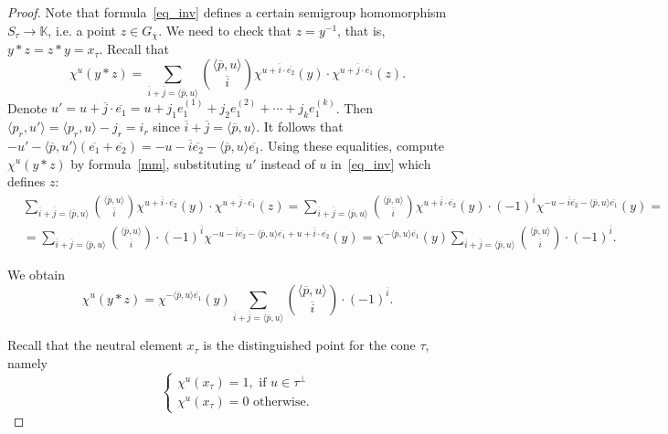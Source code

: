\documentclass[a4paper, 11pt]{amsart}
\theoremstyle{plain}
\theoremstyle{remark}
\theoremstyle{definition}
\newcommand{\KK}{\mathbb{K}}
\newcommand{\GG}{G_{\overline{\chi}}}
\newcommand{\ol}[1]{\overline{#1}}
\begin{document}
\begin{proof}
Note that formula~\eqref{eq_inv} defines a certain semigroup homomorphism $S_\tau \to \KK$, i.e. a point $z \in \GG$. We need to check that $z = y^{-1}$, that is, $y*z = z*y = x_\tau$. Recall that
\begin{equation}\label{mm}
	\chi^u (y * z) = \sum \limits_{\ol{i} + \ol{j} = \langle \ol{p}, u \rangle } { \langle \ol{p}, u \rangle \choose \ol{i} } \chi^{u + \ol{i}\cdot \ol{e_2}}(y) \cdot  \chi^{u + \ol{j}\cdot \ol{e_1}} (z).
\end{equation}
Denote $u' = u + \ol{j}\cdot \ol{e_1} = u + j_1 e_1^{(1)} + j_2 e_1^{(2)} + \cdots + j_k e_1^{(k)}$. Then $\langle p_r, u' \rangle = \langle p_r, u \rangle - j_r = i_r$ since $\ol{i} + \ol{j} = \langle \ol{p}, u \rangle$. It follows that $-u' - \langle \ol{p}, u' \rangle (\ol{e_1} + \ol{e_2}) = -u -\ol{i}\ol{e_2} - \langle \ol{p}, u \rangle\ol{e_1}$. Using these equalities, compute $\chi^u(y * z)$ by formula~\eqref{mm}, substituting $u'$ instead of $u$ in~\eqref{eq_inv} which defines $z$:
\begin{align*}
 	&\sum \limits_{\ol{i} + \ol{j} = \langle \ol{p}, u \rangle } { \langle \ol{p}, u \rangle \choose \ol{i} } \chi^{u + \ol{i}\cdot \ol{e_2}}(y) \cdot  \chi^{u + \ol{j}\cdot \ol{e_1}} (z) 
 	= \sum \limits_{\ol{i} + \ol{j} = \langle \ol{p}, u \rangle } { \langle \ol{p}, u \rangle \choose \ol{i} } \chi^{u + \ol{i}\cdot \ol{e_2}}(y) \cdot  (-1)^{\ol{i}} \chi^{-u -\ol{i}\ol{e_2} - \langle \ol{p}, u \rangle\ol{e_1}}(y)  = \\
 	&=\sum \limits_{\ol{i} + \ol{j} = \langle \ol{p}, u \rangle } { \langle \ol{p}, u \rangle \choose \ol{i} } \cdot  (-1)^{\ol{i}} \chi^{-u -\ol{i}\ol{e_2} - \langle \ol{p}, u \rangle\ol{e_1} + u + \ol{i}\cdot \ol{e_2}}(y) = 
 	\chi^{-\langle \ol{p}, u \rangle\ol{e_1} }(y) \sum \limits_{\ol{i} + \ol{j} = \langle \ol{p}, u \rangle } { \langle \ol{p}, u \rangle \choose \ol{i} } \cdot  (-1)^{\ol{i}}.
 \end{align*}

We obtain
 \begin{equation}
 	\chi^u (y * z)  = \chi^{-\langle \ol{p}, u \rangle\ol{e_1} }(y) \sum \limits_{\ol{i} + \ol{j} = \langle \ol{p}, u \rangle} {\langle \ol{p}, u \rangle \choose \ol{i} } \cdot (-1)^{\ol{i}}.
 \end{equation} 

Recall that the neutral element $x_\tau$ is the distinguished point for the cone $\tau$, namely
\begin{equation}
	\begin{cases} 
			\chi^u(x_\tau) = 1, \text{ if } u \in \tau^\perp\\
		\chi^u(x_\tau) = 0 \text{ otherwise} .
	\end{cases}
\end{equation} 


\end{proof}
\end{document}
